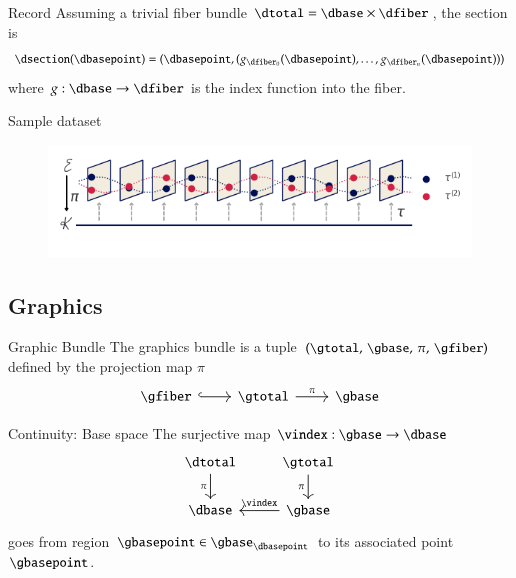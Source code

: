 \documentclass[xcolor={dvipsnames}, handout]{beamer}
\begin{document}
\begin{frame}{Record}
    Assuming a trivial fiber bundle $\dtotal = \dbase \times \dfiber$, the section is 
\begin{equation}
    \label{eq:section_return}
    \dsection(\dbasepoint) = (\dbasepoint, (g_{\dfiber_{0}}(\dbasepoint), \ldots, g_{\dfiber_{n}}(\dbasepoint)))
\end{equation}
where $g: \dbase \rightarrow \dfiber$ is the index function into the fiber.
\end{frame}

\begin{frame}{Sample dataset}
    \begin{figure}[H]
        \includegraphics[width=1\linewidth]{figures/math/fiberbundle.png}
        \label{fig:data_sections}
    \end{figure}
\end{frame}

\subsection{Graphics}
\begin{frame}{Graphic Bundle}
    The graphics bundle is a tuple $(\gtotal,\,\gbase,\,\pi ,\,\gfiber)$ defined by the projection map $\pi$
    \begin{equation}
        \label{eq:fiber_bundle}
        \begin{tikzcd}[ampersand replacement=\&]
            \gfiber \arrow[r, hook] \& \gtotal \arrow[r, "\pi"] \& \gbase
        \end{tikzcd}
    \end{equation}
\end{frame}
\begin{frame}{Continuity: Base space}
    The surjective map $\vindex: \gbase \rightarrow \dbase$ 
    \begin{equation}
        \begin{tikzcd}[ampersand replacement=\&]
            \dtotal \arrow[d, "\pi"'] \& \gtotal \arrow[d, "\pi"'] \\
            \dbase                   \& \gbase \arrow[l, "\vindex"']
        \end{tikzcd}
    \end{equation}
    goes from region $\gbasepoint \in \gbase_{\dbasepoint}$ to its associated point $\gbasepoint$. 
\end{frame}
\end{document}
